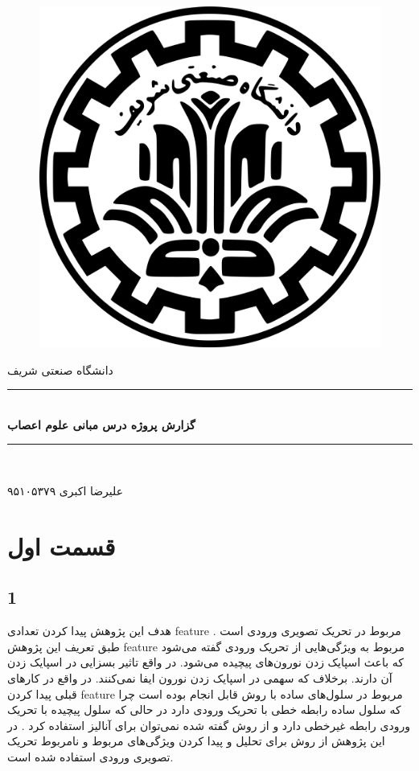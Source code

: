 \documentclass[12 pt]{article}
\date{\today}
\begin{document}
	
	\begin{titlepage}
		\newcommand{\HRule}{\rule{\linewidth}{0.5mm}} 
		\center 
		\begin{figure}[H]
			\centering
			\includegraphics[height=0.3\linewidth, width = 0.3\linewidth]{a.png}
		\end{figure}
		\textsc{\LARGE دانشگاه صنعتی شریف}\\[1.5cm] 
		\HRule \\[0.4cm]
		{ \huge \bfseries گزارش پروژه درس مبانی علوم اعصاب}\\[0.4cm]
		\HRule \\[1.5cm]
		\begin{minipage}{0.6\textwidth}
			\begin{center} \large
				
				علیرضا اکبری  ۹۵۱۰۵۳۷۹
			\end{center}
		\end{minipage}		
		\vfill 
	\end{titlepage}
\section*{قسمت اول}
\subsection*{1}
هدف این پژوهش پیدا کردن تعدادی  feature مربوط در تحریک تصویری ورودی است . طبق تعریف این پژوهش feature مربوط به ویژگی‌هایی از تحریک ورودی گفته می‌شود که باعث اسپایک زدن نورون‌های پیچیده می‌شود.  در واقع تاثیر بسزایی در اسپایک زدن آن دارند. برخلاف  
که سهمی در اسپایک زدن نورون ایفا نمی‌کنند.
در واقع  در کارهای قبلی پیدا کردن feature مربوط  در سلول‌های ساده با روش  
قابل انجام بوده است چرا که سلول‌ ساده رابطه خطی با تحریک ورودی دارد در حالی که سلول پیچیده با تحریک ورودی رابطه غیرخطی دارد و از روش گفته شده نمی‌توان برای آنالیز استفاده کرد . در این پژوهش از روش 
برای تحلیل و پیدا کردن ویژگی‌های مربوط و نامربوط تحریک تصویری ورودی استفاده شده است.
\end{document}
